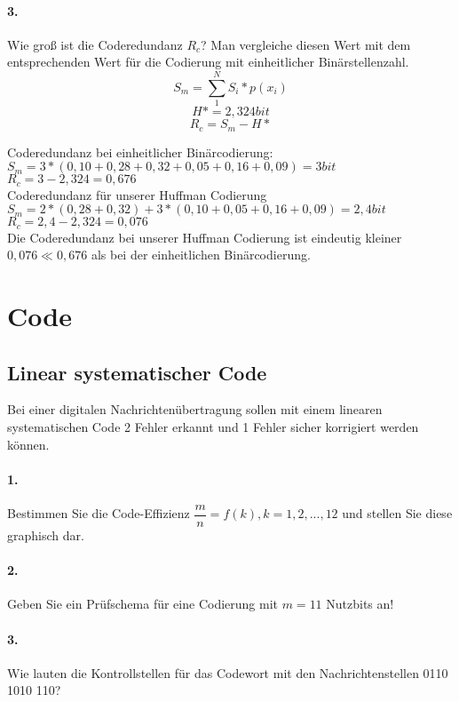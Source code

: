 \documentclass[paper=a4, fontsize=11pt]{scrartcl}
\numberwithin{equation}{section}
\numberwithin{figure}{section}
\numberwithin{table}{section}
\begin{document}
\newpage

\paragraph{3.}
Wie groß ist die Coderedundanz $R_{c}$? Man vergleiche diesen Wert mit dem entsprechenden Wert für die Codierung mit einheitlicher Binärstellenzahl. 
$$S_{m} = \sum^{N}_{1} S_{i}*p(x_{i})$$
$$H* = 2,324 bit$$
$$R_{c} = S_{m} - H*$$

Coderedundanz bei einheitlicher Binärcodierung: \\
$S_{m} = 3*(0,10+0,28+0,32+0,05+0,16+0,09) = 3 bit$ \\
$R_{c} = 3 - 2,324 = 0,676 $ \\

Coderedundanz für unserer Huffman Codierung \\
$S_{m} = 2*(0,28+0,32)+3*(0,10+0,05+0,16+0,09) = 2,4 bit$ \\
$R_{c} = 2,4 - 2,324 = 0,076 $ \\

Die Coderedundanz bei unserer Huffman Codierung ist eindeutig kleiner $0,076 \ll 0,676$ als bei der einheitlichen Binärcodierung.

\section{Code}
\subsection{Linear systematischer Code}
Bei einer digitalen Nachrichtenübertragung sollen mit einem linearen systematischen Code 2 Fehler erkannt und 1 Fehler sicher korrigiert werden können.

\paragraph{1.}
Bestimmen Sie die Code-Effizienz $\dfrac{m}{n} = f(k), k=1,2, ..., 12$ und stellen Sie diese graphisch dar. 

\paragraph{2.}
Geben Sie ein Prüfschema für eine Codierung mit $m = 11$ Nutzbits an!

\paragraph{3.}
Wie lauten die Kontrollstellen für das Codewort mit den Nachrichtenstellen 0110 1010 110?
\end{document}
